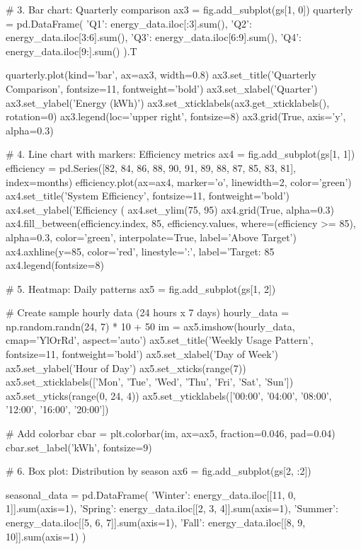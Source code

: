 {    # 3. Bar chart: Quarterly comparison
    ax3 = fig.add_subplot(gs[1, 0])
    quarterly = pd.DataFrame({
        'Q1': energy_data.iloc[:3].sum(),
        'Q2': energy_data.iloc[3:6].sum(),
        'Q3': energy_data.iloc[6:9].sum(),
        'Q4': energy_data.iloc[9:].sum()
    }).T
    
    quarterly.plot(kind='bar', ax=ax3, width=0.8)
    ax3.set_title('Quarterly Comparison', fontsize=11, fontweight='bold')
    ax3.set_xlabel('Quarter')
    ax3.set_ylabel('Energy (kWh)')
    ax3.set_xticklabels(ax3.get_xticklabels(), rotation=0)
    ax3.legend(loc='upper right', fontsize=8)
    ax3.grid(True, axis='y', alpha=0.3)
    
    # 4. Line chart with markers: Efficiency metrics
    ax4 = fig.add_subplot(gs[1, 1])
    efficiency = pd.Series([82, 84, 86, 88, 90, 91, 89, 88, 87, 85, 83, 81],
                          index=months)
    efficiency.plot(ax=ax4, marker='o', linewidth=2, color='green')
    ax4.set_title('System Efficiency', fontsize=11, fontweight='bold')
    ax4.set_ylabel('Efficiency (%
    ax4.set_ylim(75, 95)
    ax4.grid(True, alpha=0.3)
    ax4.fill_between(efficiency.index, 85, efficiency.values,
                    where=(efficiency >= 85), alpha=0.3, color='green',
                    interpolate=True, label='Above Target')
    ax4.axhline(y=85, color='red', linestyle=':', label='Target: 85%
    ax4.legend(fontsize=8)
    
    # 5. Heatmap: Daily patterns
    ax5 = fig.add_subplot(gs[1, 2])
    
    # Create sample hourly data (24 hours x 7 days)
    hourly_data = np.random.randn(24, 7) * 10 + 50
    im = ax5.imshow(hourly_data, cmap='YlOrRd', aspect='auto')
    ax5.set_title('Weekly Usage Pattern', fontsize=11, fontweight='bold')
    ax5.set_xlabel('Day of Week')
    ax5.set_ylabel('Hour of Day')
    ax5.set_xticks(range(7))
    ax5.set_xticklabels(['Mon', 'Tue', 'Wed', 'Thu', 'Fri', 'Sat', 'Sun'])
    ax5.set_yticks(range(0, 24, 4))
    ax5.set_yticklabels(['00:00', '04:00', '08:00', '12:00', '16:00', '20:00'])
    
    # Add colorbar
    cbar = plt.colorbar(im, ax=ax5, fraction=0.046, pad=0.04)
    cbar.set_label('kWh', fontsize=9)
    
    # 6. Box plot: Distribution by season
    ax6 = fig.add_subplot(gs[2, :2])
    
    seasonal_data = pd.DataFrame({
        'Winter': energy_data.iloc[[11, 0, 1]].sum(axis=1),
        'Spring': energy_data.iloc[[2, 3, 4]].sum(axis=1),
        'Summer': energy_data.iloc[[5, 6, 7]].sum(axis=1),
        'Fall': energy_data.iloc[[8, 9, 10]].sum(axis=1)
    })
    
}
